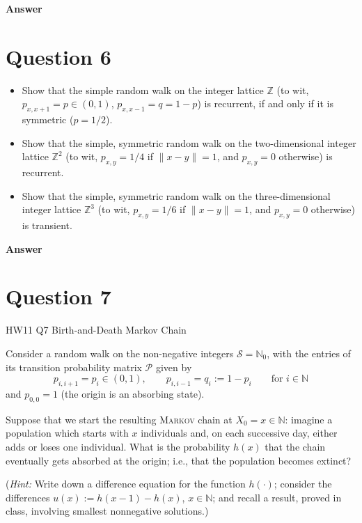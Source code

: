 \documentclass[letterpaper]{article}
\begin{document}
		
		\textbf{Answer}
		
		\clearpage
		
		\section{Question 6}
		
		\begin{itemize}
			\item[(i)] Show that the simple random walk on the integer lattice $\mathbb{Z}$ (to wit, $p_{x,x+1} = p \in (0,1)$, $p_{x,x-1} = q = 1-p$) is recurrent, if and only if it is symmetric ($p = 1/2$).
			\item[(ii)] Show that the simple, symmetric random walk on the two-dimensional integer lattice $\mathbb{Z}^2$ (to wit, $p_{x,y} = 1/4$ if $\|x - y\| = 1$, and $p_{x,y} = 0$ otherwise) is recurrent.
			\item[(ii)] Show that the simple, symmetric random walk on the three-dimensional integer lattice $\mathbb{Z}^3$ (to wit, $p_{x,y} = 1/6$ if $\|x - y\| = 1$, and $p_{x,y} = 0$ otherwise) is transient.
		\end{itemize}
		
		\textbf{Answer}
		
		\clearpage
		
		\section{Question 7}
		
		{\color{deepred} HW11 Q7 Birth-and-Death Markov Chain} 
		
		 Consider a random walk on the non-negative integers $\mathcal{S} = \mathbb{N}_0$, with the entries of its transition probability matrix $\mathcal{P}$ given by
		\[
		p_{i,i+1} = p_i \in (0,1), \qquad p_{i,i-1} = q_i := 1 - p_i \qquad \text{for } i \in \mathbb{N}
		\]
		and $p_{0,0} = 1$ (the origin is an absorbing state).
		
		\indent Suppose that we start the resulting \textsc{Markov} chain at $X_0 = x \in \mathbb{N}$: imagine a population which starts with $x$ individuals and, on each successive day, either adds or loses one individual. What is the probability $h(x)$ that the chain eventually gets absorbed at the origin; i.e., that the population becomes extinct?
		
		(\textit{Hint:} Write down a difference equation for the function $h(\cdot)$; consider the differences $u(x) := h(x-1) - h(x)$, $x \in \mathbb{N}$; and recall a result, proved in class, involving smallest nonnegative solutions.)
		
\end{document}
